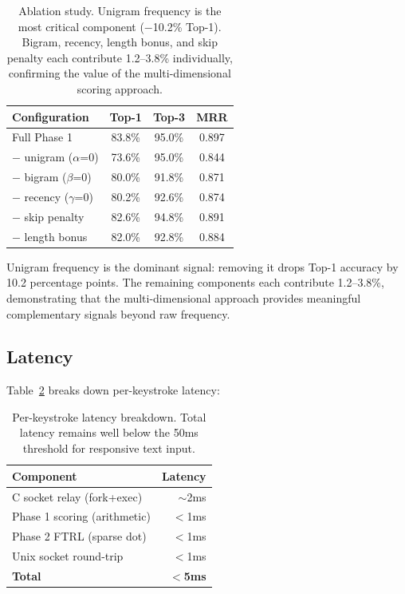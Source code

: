 \documentclass[11pt]{article}
\begin{document}
\begin{table}[h]
\centering
\begin{tabular}{lccc}
\toprule
\textbf{Configuration} & \textbf{Top-1} & \textbf{Top-3} & \textbf{MRR} \\
\midrule
Full Phase 1          & 83.8\% & 95.0\% & 0.897 \\
$-$ unigram ($\alpha$=0)  & 73.6\% & 95.0\% & 0.844 \\
$-$ bigram ($\beta$=0)    & 80.0\% & 91.8\% & 0.871 \\
$-$ recency ($\gamma$=0)  & 80.2\% & 92.6\% & 0.874 \\
$-$ skip penalty          & 82.6\% & 94.8\% & 0.891 \\
$-$ length bonus          & 82.0\% & 92.8\% & 0.884 \\
\bottomrule
\end{tabular}
\caption{Ablation study. Unigram frequency is the most critical component
  ($-$10.2\% Top-1). Bigram, recency, length bonus, and skip penalty each
  contribute 1.2--3.8\% individually, confirming the value of the
  multi-dimensional scoring approach.}
\label{tab:ablation}
\end{table}

Unigram frequency is the dominant signal: removing it drops Top-1 accuracy by
10.2 percentage points. The remaining components each contribute 1.2--3.8\%,
demonstrating that the multi-dimensional approach provides meaningful
complementary signals beyond raw frequency.

\subsection{Latency}

Table~\ref{tab:latency} breaks down per-keystroke latency:

\begin{table}[h]
\centering
\begin{tabular}{lr}
\toprule
\textbf{Component} & \textbf{Latency} \\
\midrule
C socket relay (fork+exec)     & $\sim$2ms \\
Phase 1 scoring (arithmetic)   & $<$1ms \\
Phase 2 FTRL (sparse dot)      & $<$1ms \\
Unix socket round-trip         & $<$1ms \\
\midrule
\textbf{Total}                 & \textbf{$<$5ms} \\
\bottomrule
\end{tabular}
\caption{Per-keystroke latency breakdown. Total latency remains well below
  the 50ms threshold for responsive text input.}
\label{tab:latency}
\end{table}
\end{document}
